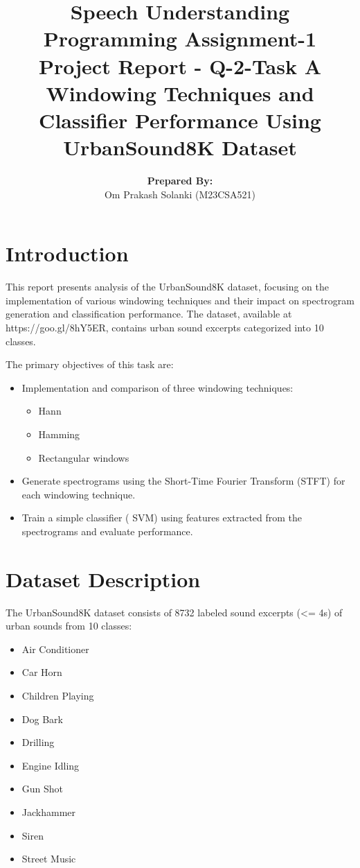 \documentclass[a4paper,12pt]{article}
\title{\textbf{Speech Understanding}\\
\bigskip
\bigskip
\bigskip
{Programming Assignment-1}\\
\bigskip\bigskip\bigskip
{Project Report - Q-2-Task A} 
\bigskip\bigskip\bigskip\\
    {Windowing Techniques and Classifier Performance Using UrbanSound8K Dataset}
}
\author{\textbf{Prepared By:}\\Om Prakash Solanki (M23CSA521)}
\begin{document}
\maketitle

\newpage
\tableofcontents
\newpage

\newpage
\section{Introduction}
This report presents analysis of the UrbanSound8K dataset, focusing on the implementation of various windowing techniques and their impact on spectrogram generation and classification performance. The dataset, available at https://goo.gl/8hY5ER, contains urban sound excerpts categorized into 10 classes. 

The primary objectives of this task are:
    \begin{itemize}
        \item Implementation and comparison of three windowing techniques: 
        \begin{itemize}
            \item Hann
            \item Hamming
            \item Rectangular windows
        \end{itemize}
        \item Generate spectrograms using the Short-Time Fourier Transform (STFT) for each windowing technique.
        \item Train a simple classifier ( SVM) using features extracted from the spectrograms and evaluate performance.
    \end{itemize}
\newpage
\section{Dataset Description}
The UrbanSound8K dataset consists of 8732 labeled sound excerpts (<= 4s) of urban sounds from 10 classes:
\begin{itemize}
    \item Air Conditioner
    \item Car Horn
    \item Children Playing
    \item Dog Bark
    \item Drilling
    \item Engine Idling
    \item Gun Shot
    \item Jackhammer
    \item Siren
    \item Street Music
\end{itemize}
\newpage
\end{document}
